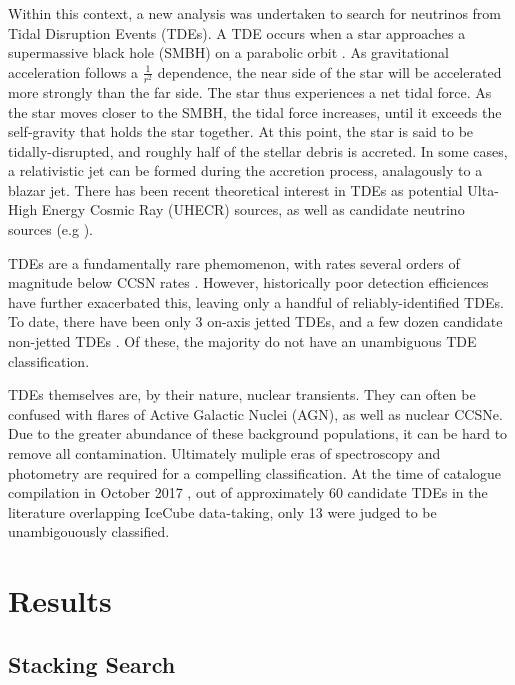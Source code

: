 \documentclass{PoS}
\begin{document}
Within this context, a new analysis was undertaken to search for neutrinos from Tidal Disruption Events (TDEs). A TDE occurs when a star approaches a supermassive black hole (SMBH) on a parabolic orbit \cite{Komossa:2015qya}. As gravitational acceleration follows a $\frac{1}{r^{2}}$ dependence, the near side of the star will be accelerated more strongly than the far side. The star thus experiences a net tidal force. As the star moves closer to the SMBH, the tidal force increases, until it exceeds the self-gravity that holds the star together. At this point, the star is said to be tidally-disrupted, and roughly half of the stellar debris is accreted. In some cases, a relativistic jet can be formed during the accretion process, analagously to a blazar jet. There has been recent theoretical interest in TDEs as potential Ulta-High Energy Cosmic Ray (UHECR) sources, as well as candidate neutrino sources (e.g \cite{Biehl:2017hnb}).

TDEs are a fundamentally rare phemomenon, with rates several orders of magnitude below CCSN rates \cite{vanVelzen:2017qum}. However, historically poor detection efficiences have further exacerbated this, leaving only a handful of reliably-identified TDEs. To date, there have been only 3 on-axis jetted TDEs, and a few dozen candidate non-jetted TDEs \cite{Komossa:2015qya, Auchettl:2016qfa}. Of these, the majority do not have an unambiguous TDE classification. 

TDEs themselves are, by their nature, nuclear transients. They can often be confused with flares of Active Galactic Nuclei (AGN), as well as nuclear CCSNe. Due to the greater abundance of these background populations, it can be hard to remove all contamination. Ultimately muliple eras of spectroscopy and photometry are required for a compelling classification. At the time of catalogue compilation in October 2017 \cite{Auchettl:2016qfa}, out of approximately 60 candidate TDEs in the literature overlapping IceCube data-taking, only 13 were judged to be unambigouously classified. 

\section{Results}
\subsection{Stacking Search}
\end{document}
